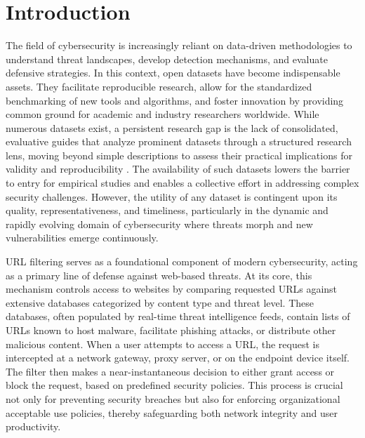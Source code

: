 \documentclass[journal,article,submit,pdftex,moreauthors]{Definitions/mdpi}
\begin{document}
\section{Introduction}

The field of cybersecurity is increasingly reliant on data-driven methodologies to understand threat landscapes, develop detection mechanisms, and evaluate defensive strategies. In this context, open datasets have become indispensable assets. They facilitate reproducible research, allow for the standardized benchmarking of new tools and algorithms, and foster innovation by providing common ground for academic and industry researchers worldwide. While numerous datasets exist, a persistent research gap is the lack of consolidated, evaluative guides that analyze prominent datasets through a structured research lens, moving beyond simple descriptions to assess their practical implications for validity and reproducibility \citep{ref-journal}. The availability of such datasets lowers the barrier to entry for empirical studies and enables a collective effort in addressing complex security challenges. However, the utility of any dataset is contingent upon its quality, representativeness, and timeliness, particularly in the dynamic and rapidly evolving domain of cybersecurity where threats morph and new vulnerabilities emerge continuously.

URL filtering serves as a foundational component of modern cybersecurity, acting as a primary line of defense against web-based threats. At its core, this mechanism controls access to websites by comparing requested URLs against extensive databases categorized by content type and threat level. These databases, often populated by real-time threat intelligence feeds, contain lists of URLs known to host malware, facilitate phishing attacks, or distribute other malicious content. When a user attempts to access a URL, the request is intercepted at a network gateway, proxy server, or on the endpoint device itself. The filter then makes a near-instantaneous decision to either grant access or block the request, based on predefined security policies. This process is crucial not only for preventing security breaches but also for enforcing organizational acceptable use policies, thereby safeguarding both network integrity and user productivity.
\end{document}
